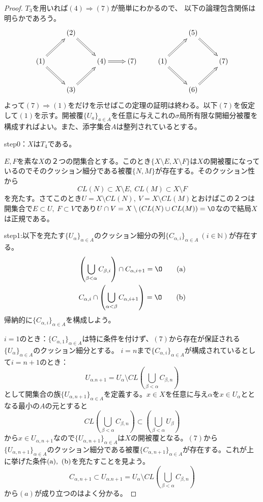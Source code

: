 \documentclass[leqno]{jsarticle}
\newcommand{\To}{\Longrightarrow}
\newcommand{\nn}{\mathbb{N}}
\newcommand{\al}{\alpha}
\newcommand{\be}{\beta}
\begin{document}
\begin{proof}$T_3$を用いれば$(4)\To(7)$が簡単にわかるので、
以下の論理包含関係は明らかであろう。
\[\xymatrix{
&   & (2) \ar@{=>}[rd]&  &  &  & (5) \ar@{=>}[rd]&\\ 
& (1)\ar@{=>}[ru] \ar@{=>}[rd]&  &(4)\ar@{=>}[r]&(7)& (1)\ar@{=>}[ru] \ar@{=>}[rd]& & (7)&\\ 
&   & (3) \ar@{=>}[ur]&  &  &  &(6) \ar@{=>}[ur]&
}\]
よって$(7)\To(1)$をだけを示せばこの定理の証明は終わる。以下$(7)$を仮定して$(1)$を示す。開被覆$\{U_a\}_{a\in A}$を任意に与えこれの$\sigma$局所有限な開細分被覆を構成すればよい。また、添字集合$A$は整列されているとする。\par
step0：$X$は$T_4$である。\par
$E,F$を素な$X$の２つの閉集合とする。このとき$\{X\setminus E,X\setminus F\}$は$X$の開被覆になっているのでそのクッション細分である被覆$\{N,M\}$が存在する。そのクッション性から
\[
CL(N)\subset X\setminus E,\ CL(M)\subset X\setminus F
\]
を充たす。さてこのとき$U=X\setminus CL(N),\ V=X\setminus CL(M)$とおけばこの２つは開集合で$E\subset U,\ F\subset V$であり$U\cap V=X\setminus (CL(N)\cup CL(M))=\O$なので結局$X$は正規である。
\par step1:以下を充たす$\{U_\al\}_{\al\in A}$のクッション細分の列$\{C_{\al,i}\}_{\al\in A}\ (i\in \nn)$が存在する。
\begin{align}
\left(\bigcup_{\beta <\alpha }C_{\beta,i}\right)\cap C_{\alpha,i+1}=\O\tag{a}\\ 
C_{\alpha , i}\cap\left(\bigcup_{\alpha <\beta}C_{\alpha,i+1}\right)=\O\tag{b}
\end{align}
帰納的に$\{C_{\al,i}\}_{\al\in A}$を構成しよう。\par
$i=1$のとき：$\{C_{\al,1}\}_{\al\in A}$は特に条件を付けず、$(7)$から存在が保証される$\{U_\al\}_{\al\in A}$のクッション細分とする。
$i=n$まで$\{C_{\al,i}\}_{\al\in A}$が構成されているとして$i=n+1$のとき：
\[
U_{\al.n+1}=U_{\al}\setminus CL\left(\bigcup_{\be<\al}C_{\be ,n}\right)
\]
として開集合の族$\{U_{\al,n+1}\}_{\al\in A}$を定義する。$x\in X$を任意に与え$\al$を$x\in U_{\al}$ととなる最小の$A$の元とすると
\[
CL\left(\bigcup_{\be<\al}C_{\be ,n}\right)\subset \left(\bigcup_{\be<\al}U_{\be }\right)
\]
から$x\in U_{\al,n+1}$なので$\{U_{\al,n+1}\}_{\al\in A}$は$X$の開被覆となる。$(7)$から$\{U_{\al,n+1}\}_{\al\in A}$のクッション細分である被覆$\{C_{\al,n+1}\}_{\al\in A}$が存在する。これが上に挙げた条件$({\rm a}),\ ({\rm b})$を充たすことを見よう。
\[
C_{\al,n+1}\subset U_{\al.n+1}=U_{\al}\setminus CL\left(\bigcup_{\be<\al}C_{\be ,n}\right)
\]
から$(a)$が成り立つのはよく分かる。\par

\end{proof}
\end{document}

